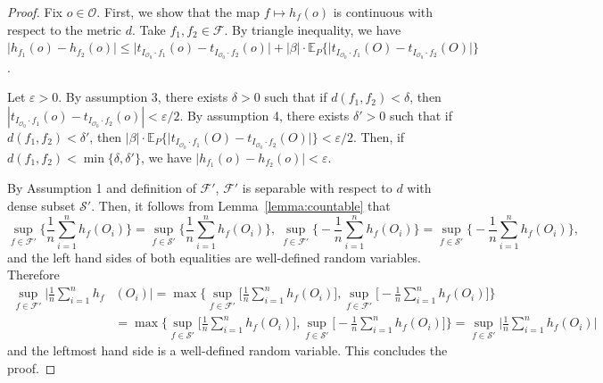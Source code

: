 \documentclass[10pt,a4paper]{amsart}
\newcommand{\E}{\mathbb{E}}
\newcommand{\mc}{\mathcal}
\begin{document}
\begin{proof} Fix $o\in\mc{O}$. First, we show that the map $f\mapsto h_f(o)$ is continuous with respect to the metric $d$. Take $f_1,f_2\in\mc{F}$. By triangle inequality, we have $ \vert h_{f_1}(o)-h_{f_2}(o)\vert\le \vert t_{I_{\mc{O}_0}\cdot f_1}(o)-t_{I_{\mc{O}_0}\cdot f_2}(o)\vert +|\beta|\cdot\E_P\{\vert  t_{I_{\mc{O}_0}\cdot f_1}(O)-t_{I_{\mc{O}_0}\cdot f_2}(O)\vert\}$.

Let $\varepsilon>0$. By assumption 3, there exists $\delta>0$ such that if $d(f_1,f_2)<\delta$, then $\left\vert t_{I_{\mc{O}_0}\cdot f_1}(o)-t_{I_{\mc{O}_0}\cdot f_2}(o)\right\vert <\varepsilon/2$. By assumption 4, there exists $\delta'>0$ such that  if $d(f_1,f_2)<\delta'$, then $|\beta|\cdot\E_P\{\vert  t_{I_{\mc{O}_0}\cdot f_1}(O)-t_{I_{\mc{O}_0}\cdot f_2}(O)\vert\}<\varepsilon/2$. Then, if $d(f_1,f_2)<\min\{\delta,\delta'\}$, we have $ \vert h_{f_1}(o)-h_{f_2}(o)\vert<\varepsilon$.

By Assumption 1 and definition of $\mc{F}'$, 
$\mc{F}'$ is separable with respect to $d$ with dense subset $\mc{S}'$. Then, it follows from Lemma~\ref{lemma:countable} that 
\[
\sup_{f\in \mc{F}'} \Big\{\frac{1}{n}\sum_{i=1}^nh_f(O_i) \Big\}
= \sup_{f \in \mc{S}'} \Big\{\frac{1}{n}\sum_{i=1}^nh_f(O_i) \Big\},\: \sup_{f\in \mc{F}'} \Big\{-\frac{1}{n}\sum_{i=1}^nh_f(O_i) \Big\}
= \sup_{f \in \mc{S}'} \Big\{-\frac{1}{n}\sum_{i=1}^nh_f(O_i) \Big\},
\]
and the left hand sides of both equalities are well-defined random variables. Therefore
\begin{align*}
    \sup_{f\in \mc{F}'} \Big\vert\frac{1}{n}\sum_{i=1}^nh_f&(O_i) \Big\vert = \max\Bigg\{\sup_{f\in \mc{F}'} \Big[\frac{1}{n}\sum_{i=1}^nh_f(O_i) \Big],\sup_{f\in \mc{F}'} \Big[-\frac{1}{n}\sum_{i=1}^nh_f(O_i) \Big]\Bigg\}
    \\
    &=\max\Bigg\{\sup_{f\in \mc{S}'} \Big[\frac{1}{n}\sum_{i=1}^nh_f(O_i) \Big],\sup_{f\in \mc{S}'} \Big[-\frac{1}{n}\sum_{i=1}^nh_f(O_i) \Big]\Bigg\}=\sup_{f\in \mc{S}'} \Big\vert\frac{1}{n}\sum_{i=1}^nh_f(O_i) \Big\vert
\end{align*}
and the leftmost hand side is a well-defined random variable. This concludes the proof.
\end{proof}
\end{document}
